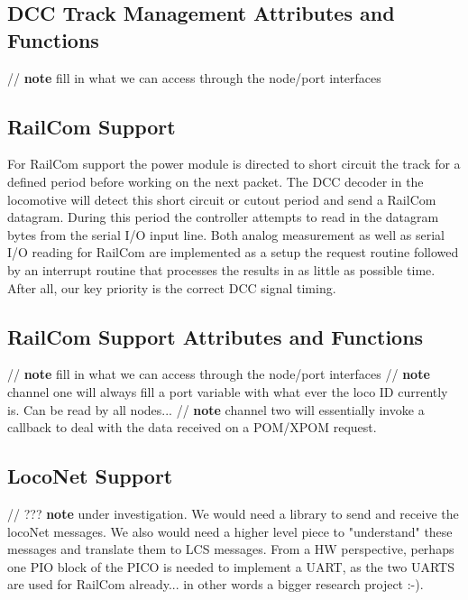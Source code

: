
\subsection{DCC Track Management Attributes and Functions}

// \textbf{note} fill in what we can access through the node/port interfaces


\subsection{RailCom Support}

For RailCom support the power module is directed to short circuit the track for a defined period before working on the next packet. The DCC decoder in the locomotive will detect this short circuit or cutout period and send a RailCom datagram. During this period the controller attempts to read in the datagram bytes from the serial I/O input line. Both analog measurement as well as serial I/O reading for RailCom are implemented as a setup the request routine followed by an interrupt routine that processes the results in as little as possible time. After all, our key priority is the correct DCC signal timing.

\subsection{RailCom Support Attributes and Functions}

// \textbf{note} fill in what we can access through the node/port interfaces
// \textbf{note} channel one will always fill a port variable with what ever the loco ID currently is. Can be read by all nodes...
// \textbf{note} channel two will essentially invoke a callback to deal with the data received on a POM/XPOM request.



\subsection{LocoNet Support}

// ??? \textbf{note} under investigation. We would need a library to send and receive the locoNet messages. We also would need a higher level piece to "understand" these messages and translate them to LCS messages. From a HW perspective, perhaps one PIO block of the PICO is needed to implement a UART, as the two UARTS are used for RailCom already... in other words a bigger research project :-).

